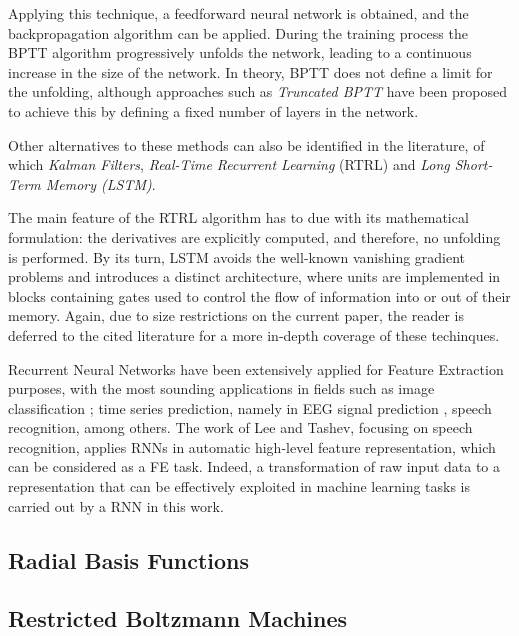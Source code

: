 \documentclass[9pt,journal,compsoc]{IEEEtran}
\begin{document}
Applying this technique, a feedforward neural network is obtained, and the backpropagation algorithm can be applied. During the training process the BPTT algorithm progressively unfolds the network, leading to a continuous increase in the size of the network. In theory, BPTT does not define a limit for the unfolding, although approaches such as \emph{Truncated BPTT} have been proposed to achieve this by defining a fixed number of layers in the network.

Other alternatives to these methods can also be identified in the literature, of which \emph{Kalman Filters}\cite{kalman1960new}, \emph{Real-Time Recurrent Learning} (RTRL)\cite{williams1989learning} and \emph{Long Short-Term Memory (LSTM)}\cite{hochreiter1997long}.

The main feature of the RTRL algorithm has to due with its mathematical formulation: the derivatives are explicitly computed, and therefore, no unfolding is performed. By its turn, LSTM avoids the well-known vanishing gradient problems and introduces a distinct architecture, where units are implemented in blocks containing gates used to control the flow of information into or out of their memory. Again, due to size restrictions on the current paper, the reader is deferred to the cited literature for a more in-depth coverage of these techinques.

Recurrent Neural Networks have been extensively applied for Feature Extraction purposes, with the most sounding applications in fields such as image classification \cite{graves2009offline}; time series prediction, namely in EEG signal prediction \cite{prasad2014deep}, speech recognition\cite{lee2015high}, among others. The work of Lee and Tashev\cite{lee2015high}, focusing on speech recognition, applies RNNs in automatic high-level feature representation, which can be considered as a FE task. Indeed, a transformation of raw input data to a representation that can be effectively exploited in machine learning tasks is carried out by a RNN in this work.

\subsection{Radial Basis Functions}



\subsection{Restricted Boltzmann Machines}
\end{document}
